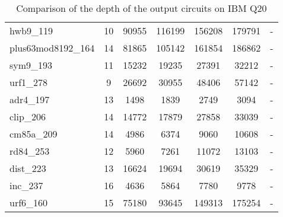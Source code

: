 \documentclass[journal]{IEEEtran}
\begin{document}
\begin{table*}[!th]
\begin{center}
\begin{tabular}{|p{4.3cm}<{\centering}|c|c|c|c|c|c|}
				hwb9\_119 & 10 & 90955 & 116199 & 156208 & 179791 & - \\ 
				plus63mod8192\_164 & 14 & 81865 & 105142 & 161854 & 186862 & - \\ 
				sym9\_193 & 11 & 15232 & 19235 & 27391 & 32212 & - \\ 
				urf1\_278 & 9 & 26692 & 30955 & 48406 & 57142 & - \\ 
				adr4\_197 & 13 & 1498 & 1839 & 2749 & 3094 & - \\ 
				clip\_206 & 14 & 14772 & 17879 & 27858 & 33039 & - \\ 
				cm85a\_209 & 14 & 4986 & 6374 & 9060 & 10608 & - \\ 
				rd84\_253 & 12 & 5960 & 7261 & 11072 & 13103 & - \\ 
				dist\_223 & 13 & 16624 & 19694 & 30619 & 35329 & - \\ 
				inc\_237 & 16 & 4636 & 5864 & 7780 & 9778 & - \\ 
				urf6\_160 & 15 & 75180 & 93645 & 149313 & 175254 & - \\
				\hline
				
			\end{tabular} 
		\end{center}					
		\caption{Comparison of  the depth of the output circuits on  IBM Q20} 
		\label{tab8}
	\end{table*}	
	
\end{document}
